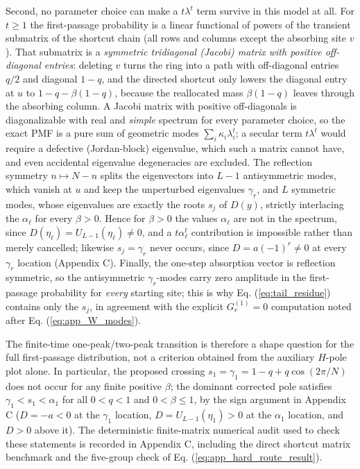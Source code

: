 \documentclass[superscriptaddress, amsmath, amssymb, aps, pre, floatfix]{revtex4-2}
\begin{document}
Second, no parameter choice can make a \(t\lambda^t\) term survive in this model at all.  For \(t\geq1\) the first-passage probability is a linear functional of powers of the transient submatrix of the shortcut chain (all rows and columns except the absorbing site \(v\)).  That submatrix is a \emph{symmetric tridiagonal (Jacobi) matrix with positive off-diagonal entries}: deleting \(v\) turns the ring into a path with off-diagonal entries \(q/2\) and diagonal \(1-q\), and the directed shortcut only lowers the diagonal entry at \(u\) to \(1-q-\beta(1-q)\), because the reallocated mass \(\beta(1-q)\) leaves through the absorbing column.  A Jacobi matrix with positive off-diagonals is diagonalizable with real and \emph{simple} spectrum for every parameter choice, so the exact PMF is a pure sum of geometric modes \(\sum_i\kappa_i\lambda_i^t\); a secular term \(t\lambda^t\) would require a defective (Jordan-block) eigenvalue, which such a matrix cannot have, and even accidental eigenvalue degeneracies are excluded.  The reflection symmetry \(n\mapsto N-n\) splits the eigenvectors into \(L-1\) antisymmetric modes, which vanish at \(u\) and keep the unperturbed eigenvalues \(\gamma_r\), and \(L\) symmetric modes, whose eigenvalues are exactly the roots \(s_j\) of \(D(y)\), strictly interlacing the \(\alpha_\ell\) for every \(\beta>0\).  Hence for \(\beta>0\) the values \(\alpha_\ell\) are not in the spectrum, since \(D(\eta_\ell)=U_{L-1}(\eta_\ell)\neq0\), and a \(t\alpha_\ell^t\) contribution is impossible rather than merely cancelled; likewise \(s_j=\gamma_r\) never occurs, since \(D=a(-1)^r\neq0\) at every \(\gamma_r\) location (Appendix C).  Finally, the one-step absorption vector is reflection symmetric, so the antisymmetric \(\gamma_r\)-modes carry zero amplitude in the first-passage probability for \emph{every} starting site; this is why Eq. (\ref{eq:tail_residue}) contains only the \(s_j\), in agreement with the explicit \(G^{(1)}_r=0\) computation noted after Eq. (\ref{eq:app_W_modes}).

The finite-time one-peak/two-peak transition is therefore a shape question for the full first-passage distribution, not a criterion obtained from the auxiliary \(H\)-pole plot alone.  In particular, the proposed crossing \(s_1=\gamma_1=1-q+q\cos(2\pi/N)\) does not occur for any finite positive \(\beta\); the dominant corrected pole satisfies \(\gamma_1<s_1<\alpha_1\) for all \(0<q<1\) and \(0<\beta\leq1\), by the sign argument in Appendix C (\(D=-a<0\) at the \(\gamma_1\) location, \(D=U_{L-1}(\eta_1)>0\) at the \(\alpha_1\) location, and \(D>0\) above it).
The deterministic finite-matrix numerical audit used to check these statements is recorded in Appendix C, including the direct shortcut matrix benchmark and the five-group check of Eq. (\ref{eq:app_hard_route_result}).
\end{document}
